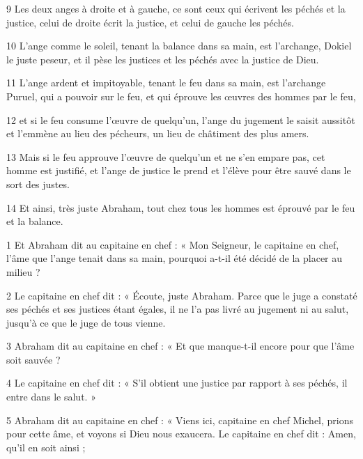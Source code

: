 \par 9 Les deux anges à droite et à gauche, ce sont ceux qui écrivent les péchés et la justice, celui de droite écrit la justice, et celui de gauche les péchés.

\par 10 L'ange comme le soleil, tenant la balance dans sa main, est l'archange, Dokiel le juste peseur, et il pèse les justices et les péchés avec la justice de Dieu.

\par 11 L'ange ardent et impitoyable, tenant le feu dans sa main, est l'archange Puruel, qui a pouvoir sur le feu, et qui éprouve les œuvres des hommes par le feu,

\par 12 et si le feu consume l'œuvre de quelqu'un, l'ange du jugement le saisit aussitôt et l'emmène au lieu des pécheurs, un lieu de châtiment des plus amers.

\par 13 Mais si le feu approuve l'œuvre de quelqu'un et ne s'en empare pas, cet homme est justifié, et l'ange de justice le prend et l'élève pour être sauvé dans le sort des justes.

\par 14 Et ainsi, très juste Abraham, tout chez tous les hommes est éprouvé par le feu et la balance.


\par 1 Et Abraham dit au capitaine en chef : « Mon Seigneur, le capitaine en chef, l'âme que l'ange tenait dans sa main, pourquoi a-t-il été décidé de la placer au milieu ?

\par 2 Le capitaine en chef dit : « Écoute, juste Abraham. Parce que le juge a constaté ses péchés et ses justices étant égales, il ne l'a pas livré au jugement ni au salut, jusqu'à ce que le juge de tous vienne.

\par 3 Abraham dit au capitaine en chef : « Et que manque-t-il encore pour que l'âme soit sauvée ?

\par 4 Le capitaine en chef dit : « S'il obtient une justice par rapport à ses péchés, il entre dans le salut. »

\par 5 Abraham dit au capitaine en chef : « Viens ici, capitaine en chef Michel, prions pour cette âme, et voyons si Dieu nous exaucera. Le capitaine en chef dit : Amen, qu'il en soit ainsi ;

